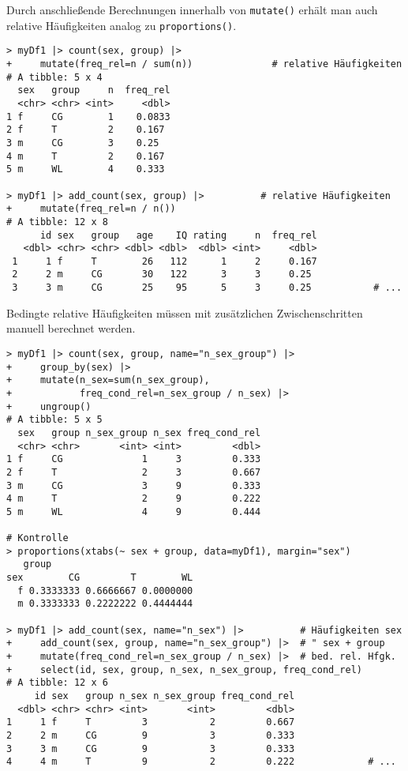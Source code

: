 Durch anschließende Berechnungen innerhalb von \lstinline!mutate()! erhält man auch relative Häufigkeiten analog zu \lstinline!proportions()!.
\begin{lstlisting}
> myDf1 |> count(sex, group) |>
+     mutate(freq_rel=n / sum(n))              # relative Häufigkeiten
# A tibble: 5 x 4
  sex   group     n  freq_rel
  <chr> <chr> <int>     <dbl>
1 f     CG        1    0.0833
2 f     T         2    0.167 
3 m     CG        3    0.25  
4 m     T         2    0.167 
5 m     WL        4    0.333 

> myDf1 |> add_count(sex, group) |>          # relative Häufigkeiten
+     mutate(freq_rel=n / n())
# A tibble: 12 x 8
      id sex   group   age    IQ rating     n  freq_rel
   <dbl> <chr> <chr> <dbl> <dbl>  <dbl> <int>     <dbl>
 1     1 f     T        26   112      1     2     0.167 
 2     2 m     CG       30   122      3     3     0.25  
 3     3 m     CG       25    95      5     3     0.25           # ...
\end{lstlisting}

Bedingte relative Häufigkeiten müssen mit zusätzlichen Zwischenschritten manuell berechnet werden.
\begin{lstlisting}
> myDf1 |> count(sex, group, name="n_sex_group") |>
+     group_by(sex) |>
+     mutate(n_sex=sum(n_sex_group),
+            freq_cond_rel=n_sex_group / n_sex) |>
+     ungroup()
# A tibble: 5 x 5
  sex   group n_sex_group n_sex freq_cond_rel
  <chr> <chr>       <int> <int>         <dbl>
1 f     CG              1     3         0.333
2 f     T               2     3         0.667
3 m     CG              3     9         0.333
4 m     T               2     9         0.222
5 m     WL              4     9         0.444

# Kontrolle
> proportions(xtabs(~ sex + group, data=myDf1), margin="sex")
   group
sex        CG         T        WL
  f 0.3333333 0.6666667 0.0000000
  m 0.3333333 0.2222222 0.4444444

> myDf1 |> add_count(sex, name="n_sex") |>          # Häufigkeiten sex
+     add_count(sex, group, name="n_sex_group") |>  # " sex + group
+     mutate(freq_cond_rel=n_sex_group / n_sex) |>  # bed. rel. Hfgk.
+     select(id, sex, group, n_sex, n_sex_group, freq_cond_rel)
# A tibble: 12 x 6
     id sex   group n_sex n_sex_group freq_cond_rel
  <dbl> <chr> <chr> <int>       <int>         <dbl>
1     1 f     T         3           2         0.667
2     2 m     CG        9           3         0.333
3     3 m     CG        9           3         0.333
4     4 m     T         9           2         0.222             # ...
\end{lstlisting}
